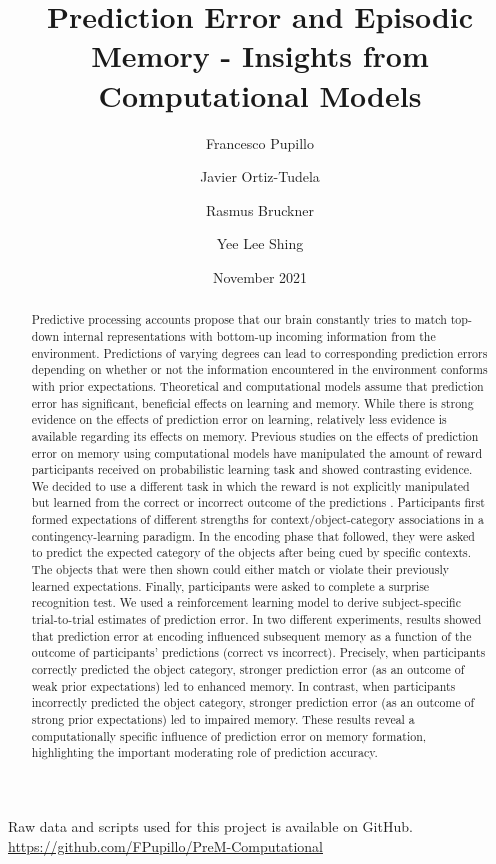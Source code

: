 \documentclass[a4paper,12pt]{article}
\title{Prediction Error and Episodic Memory - Insights from Computational Models}
\author[1]{Francesco Pupillo}
\author[1]{Javier Ortiz-Tudela}
\author[2]{Rasmus Bruckner}
\author[1]{Yee Lee Shing}
\affil[1]{Goethe-Universität Frankfurt}
\affil[2]{Freie Universität Berlin}
\date{November 2021}
\begin{document}
{
\hypersetup{linkcolor=black}
\tableofcontents
}
\setlength{\parindent}{10ex}

\maketitle

\noindent
Raw data and scripts used for this project is available on GitHub. \url{https://github.com/FPupillo/PreM-Computational} 

\doublespacing

\begin{abstract}
\noindent
Predictive processing accounts propose that our brain constantly tries to match top-down internal representations with bottom-up incoming information from the environment. Predictions of varying degrees can lead to corresponding prediction errors depending on whether or not the information encountered in the environment conforms with prior expectations. Theoretical and computational models assume that prediction error has significant, beneficial effects on learning and memory. While there is strong evidence on the effects of prediction error on learning, relatively less evidence is available regarding its effects on memory. Previous studies on the effects of prediction error on memory using computational models have manipulated the amount of reward participants received on probabilistic learning task and showed contrasting evidence. We decided to use a different task in which the reward is not explicitly manipulated but learned from the correct or incorrect outcome of the predictions . Participants first formed expectations of different strengths for context/object-category associations in a contingency-learning paradigm. In the encoding phase that followed, they were asked to predict the expected category of the objects after being cued by specific contexts. The objects that were then shown could either match or violate their previously learned expectations. Finally, participants were asked to complete a surprise recognition test. We used a reinforcement learning model to derive subject-specific trial-to-trial estimates of prediction error. In two different experiments, results showed that prediction error at encoding influenced subsequent memory as a function of the outcome of participants’ predictions (correct vs incorrect). Precisely, when participants correctly predicted the object category, stronger prediction error (as an outcome of weak prior expectations) led to enhanced memory. In contrast, when participants incorrectly predicted the object category, stronger prediction error (as an outcome of strong prior expectations) led to impaired memory. These results reveal a computationally specific influence of prediction error on memory formation, highlighting the important moderating role of prediction accuracy.     
\end{abstract}
\end{document}
